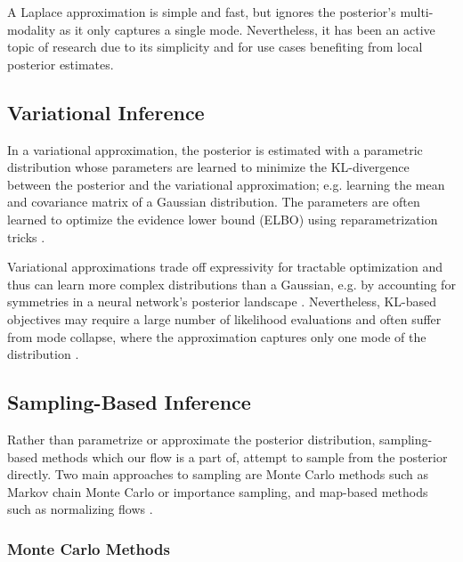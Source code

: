A Laplace approximation is simple and fast, but ignores the posterior's multi-modality as it only captures a single mode. Nevertheless, it has been an active topic of research \citep{daxbergerLaplaceReduxEffortless2021} due to its simplicity and for use cases benefiting from local posterior estimates. 

\subsection{Variational Inference}

In a variational approximation, the posterior is estimated with a parametric distribution whose parameters are learned to minimize the KL-divergence between the posterior and the variational approximation; e.g. learning the mean and covariance matrix of a Gaussian distribution. The parameters are often learned to optimize the evidence lower bound (ELBO) using reparametrization tricks \citep{kingmaAutoEncodingVariationalBayes2022b,blundellWeightUncertaintyNeural2015a}. 

Variational approximations trade off expressivity for tractable optimization and thus can learn more complex distributions than a Gaussian, e.g. by accounting for symmetries in a neural network's posterior landscape \citep{gelbergVariationalInferenceFailures2024}. Nevertheless, KL-based objectives may require a large number of likelihood evaluations and often suffer from mode collapse, where the approximation captures only one mode of the distribution \citep{felardosDesigningLossesDatafree2023}. 

\subsection{Sampling-Based Inference}

Rather than parametrize or approximate the posterior distribution, sampling-based methods which our flow is a part of, attempt to sample from the posterior directly. Two main approaches to sampling are Monte Carlo methods \citep{barbuMonteCarloMethods2020} such as Markov chain Monte Carlo or importance sampling, and map-based methods \citep{marzoukSamplingMeasureTransport2016} such as normalizing flows \citep{rezendeVariationalInferenceNormalizing2015}.

\subsubsection{Monte Carlo Methods}

